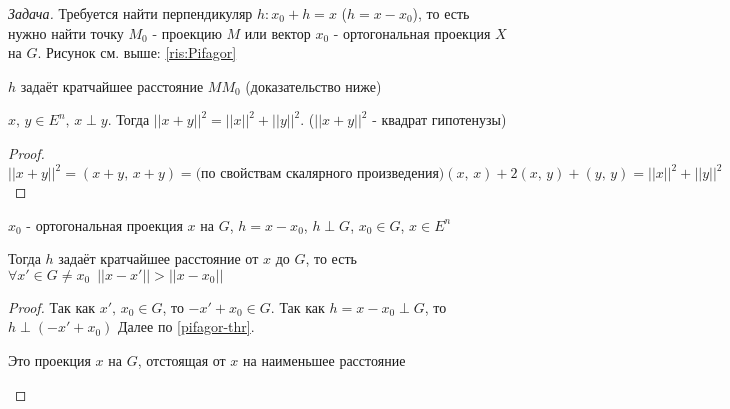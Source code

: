 
\textit{Задача.  } Требуется найти перпендикуляр $h: x_0 + h = x$ ($h = x - x_0$), то есть нужно найти точку $M_0$ - 
проекцию $M$ или вектор $x_0$ - ортогональная проекция $X$ на $G$. Рисунок см. выше: \ref{ris:Pifagor}

\begin{remark}
    $h$ задаёт кратчайшее расстояние $MM_0$ (доказательство ниже)
\end{remark}

\begin{lemma}
    $x, \, y \in E^n, \, x \perp y.$ Тогда $||x+y||^2 = ||x||^2 + ||y||^2$. ($||x+y||^2$ - квадрат гипотенузы)
\end{lemma}

\begin{proof}
    $||x+y||^2 = (x+y, \, x+y) = \text{(по свойствам скалярного произведения)} (x, \, x) + 2(x, \, y) + (y, \, y) = ||x||^2 + ||y||^2$
\end{proof}

\begin{theorem}
    $x_0$ - ортогональная проекция $x$ на $G$, $h=x-x_0$, $h \perp G$, $x_0 \in G$, $x \in E^n$
    
    Тогда $h$ задаёт кратчайшее расстояние от $x$ до $G$, то есть $\forall x' \in G \neq x_0 \,\,\, ||x-x'|| > ||x-x_0||$ 
\end{theorem}
\begin{proof}
    Так как $x', \, x_0 \in G$, то $-x'+x_0 \in G$. Так как $h = x - x_0 \perp G$, то $h \perp (-x' + x_0)$
    Далее по \ref{pifagor-thr}.
    \begin{remark}
        Это проекция $x$ на $G$, отстоящая от $x$ на наименьшее расстояние
    \end{remark}
\end{proof}